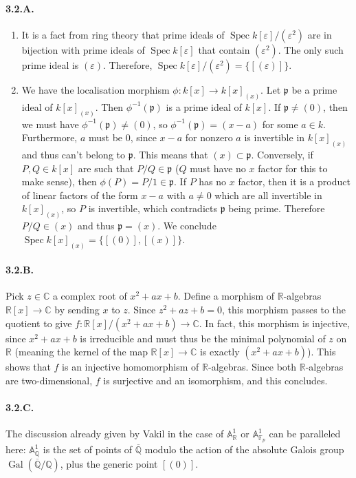 \documentclass{article}
\newcommand{\Q}{\mathbb{Q}}
\newcommand{\R}{\mathbb{R}}
\newcommand{\C}{\mathbb{C}}
\newcommand{\F}{\mathbb{F}}
\DeclareMathOperator{\Gal}{Gal}
\DeclareMathOperator{\Spec}{Spec}
\renewcommand{\epsilon}{\varepsilon}
\begin{document}
\paragraph{3.2.A.}
\begin{enumerate}
    \item It is a fact from ring theory that prime ideals of $\Spec k[\varepsilon]/(\epsilon^2)$ are in bijection with prime ideals of $\Spec k[\varepsilon]$ that contain $(\epsilon^2)$. The only such prime ideal is $(\varepsilon)$. Therefore, $\Spec k[\varepsilon]/(\epsilon^2) = \{[(\varepsilon)]\}$.
    \item We have the localisation morphism $\phi : k[x] \to k[x]_{(x)}$. Let $\mathfrak{p}$ be a prime ideal of $k[x]_{(x)}$. Then $\phi^{-1}(\mathfrak{p})$ is a prime ideal of $k[x]$. If $\mathfrak{p} \ne (0)$, then we must have $\phi^{-1}(\mathfrak{p}) \ne (0)$, so $\phi^{-1}(\mathfrak{p}) = (x-a)$ for some $a \in k$. Furthermore, $a$ must be $0$, since $x-a$ for nonzero $a$ is invertible in $k[x]_{(x)}$ and thus can't belong to $\mathfrak{p}$. This means that $(x) \subset \mathfrak{p}$. Conversely, if $P,Q \in k[x]$ are such that $P/Q \in \mathfrak{p}$ ($Q$ must have no $x$ factor for this to make sense), then $\phi(P) = P/1 \in \mathfrak{p}$. If $P$ has no $x$ factor, then it is a product of linear factors of the form $x-a$ with $a\ne 0$ which are all invertible in $k[x]_{(x)}$, so $P$ is invertible, which contradicts $\mathfrak{p}$ being prime. Therefore $P/Q \in (x)$ and thus $\mathfrak{p} = (x)$. We conclude $\Spec k[x]_{(x)} = \{[(0)], [(x)]\}$.
\end{enumerate}

\paragraph{3.2.B.} Pick $z \in \C$ a complex root of $x^2 + ax + b$. Define a morphism of $\R$-algebras $\R[x] \to \C$ by sending $x$ to $z$. Since $z^2 + az + b = 0$, this morphism passes to the quotient to give $f : \R[x]/(x^2 + ax + b) \to \C$. In fact, this morphism is injective, since $x^2 + ax + b$ is irreducible and must thus be the minimal polynomial of $z$ on $\R$ (meaning the kernel of the map $\R[x] \to \C$ is exactly $(x^2 + ax +b)$). This shows that $f$ is an injective homomorphism of $\R$-algebras. Since both $\R$-algebras are two-dimensional, $f$ is surjective and an isomorphism, and this concludes.

\paragraph{3.2.C.} The discussion already given by Vakil in the case of $\mathbb{A}^1_\R$ or $\mathbb{A}_{\F_p}^1$ can be paralleled here: $\mathbb{A}^1_\Q$ is the set of points of $\overline{\Q}$ modulo the action of the absolute Galois group $\Gal(\overline{\Q}/\Q)$, plus the generic point $[(0)]$.
\end{document}
